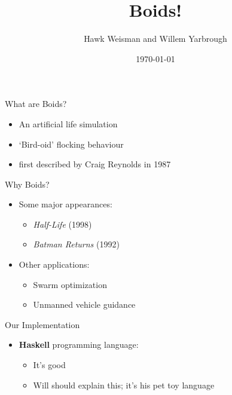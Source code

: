 \documentclass{beamer}
\title{Boids!}
\author[Weisman and Yarbrough]{Hawk Weisman and Willem Yarbrough}
\institute[Allegheny College]{Department of Computer Science \\ Allegheny College}
\date{\today}
\begin{document}
\begin{frame}
  \titlepage
\end{frame}

\begin{frame}
    \huge{What are Boids?}\normalsize
    \begin{itemize}
        \item An artificial life simulation~\cite{hartman2006autonomous,reynolds1987flocks}
        \item `Bird-oid' flocking behaviour~\cite{hartman2006autonomous,reynolds1987flocks}
        \item first described by Craig Reynolds in 1987~\cite{reynolds1987flocks}
    \end{itemize}
\end{frame}

\begin{frame}
    \huge{Why Boids?}\normalsize
    \begin{itemize}
        \item Some major appearances:
        \begin{itemize}
            \item \textit{Half-Life} (1998)
            \item \textit{Batman Returns} (1992)
        \end{itemize}
        \item Other applications:
        \begin{itemize}
            \item Swarm optimization
            \item Unmanned vehicle guidance
        \end{itemize}
    \end{itemize}
\end{frame}

\begin{frame}
\huge{Our Implementation}\normalsize
\begin{itemize}
    \item \textbf{Haskell} programming language:
    \begin{itemize}
        \item It's good~\cite{hudak1994haskell}
        \item Will should explain this; it's his pet toy language
    \end{itemize}
\end{itemize}

\end{frame}
\end{document}
